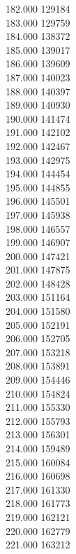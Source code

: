 { 182.000	129184 \\
 183.000	129759 \\
 184.000	138372 \\
 185.000	139017 \\
 186.000	139609 \\
 187.000	140023 \\
 188.000	140397 \\
 189.000	140930 \\
 190.000	141474 \\
 191.000	142102 \\
 192.000	142467 \\
 193.000	142975 \\
 194.000	144454 \\
 195.000	144855 \\
 196.000	145501 \\
 197.000	145938 \\
 198.000	146557 \\
 199.000	146907 \\
 200.000	147421 \\
 201.000	147875 \\
 202.000	148428 \\
 203.000	151164 \\
 204.000	151580 \\
 205.000	152191 \\
 206.000	152705 \\
 207.000	153218 \\
 208.000	153891 \\
 209.000	154446 \\
 210.000	154824 \\
 211.000	155330 \\
 212.000	155793 \\
 213.000	156301 \\
 214.000	159489 \\
 215.000	160084 \\
 216.000	160698 \\
 217.000	161330 \\
 218.000	161773 \\
 219.000	162121 \\
 220.000	162779 \\
 221.000	163212 \\
}
